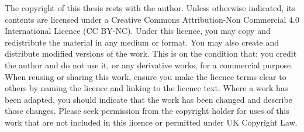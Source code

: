 The copyright of this thesis rests with the author. Unless otherwise
indicated, its contents are licensed under a Creative Commons
Attribution-Non Commercial 4.0 International Licence (CC BY-NC).
Under this licence, you may copy and redistribute the material in any
medium or format. You may also create and distribute modified
versions of the work. This is on the condition that: you credit the
author and do not use it, or any derivative works, for a commercial
purpose.
When reusing or sharing this work, ensure you make the licence
terms clear to others by naming the licence and linking to the licence
text. Where a work has been adapted, you should indicate that the
work has been changed and describe those changes.
Please seek permission from the copyright holder for uses of this
work that are not included in this licence or permitted under UK
Copyright Law.